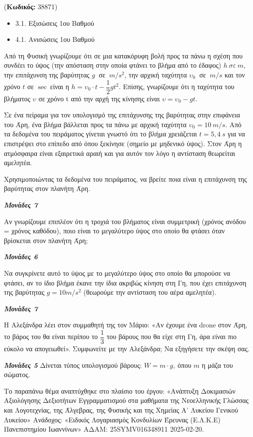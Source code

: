\documentclass[11pt,a4paper,twoside]{book}
\newcounter{askhsh}[chapter]
\renewcommand{\theaskhsh}{
	\bf{\titlefont{\Large{\thechapter}}.\arabic{askhsh}}
}
\newcommand{\Askhsh}[2]{\refstepcounter{askhsh}{\titlefont{Άσκηση\theaskhsh} - \textcolor{maincolor}{ΘΕΜΑ #2}} ({\small{\textbf{Κωδικός:} #1}})\\}{}
\newenvironment{ylh}{
\begin{tcolorbox}[
breakable,
enhanced standard,
titlerule=0pt,
toprule=0pt, 
rightrule=0pt, 
bottomrule=0pt,
title={\titlefont Ύλη άσκησης},
colback=white,
opacityback=0,
left=2mm,
top=1mm,
bottom=0mm,
boxrule=0pt,
colframe=white,
borderline west={1.5mm}{0pt}{secondarycolor},
leftrule=2mm,
sharp corners,
coltitle=black
]
\begin{itemize}[leftmargin=3mm, itemsep=0mm, label=\textcolor{secondarycolor}{{\small\faBook}}]
}{
\end{itemize}
\end{tcolorbox}
}
\newcommand{\monades}[1]{
\hspace*{\fill}
\textbf{\textit{\textcolor{maincolor}{Μονάδες #1}}}}
\begin{document}
\vspace{4mm}
\Askhsh{38871}{4}
\begin{ylh}
    \item 3.1. Εξισώσεις 1ου Βαθμού
    \item 4.1. Ανισώσεις 1ου Βαθμού
\end{ylh}

Από τη Φυσική γνωρίζουμε ότι σε μια κατακόρυφη βολή προς τα πάνω η σχέση που συνδέει το ύψος (την απόσταση στην οποία φτάνει το βλήμα από το έδαφος) $h\ \sigma\varepsilon\ m$, την επιτάχυνση της βαρύτητας $g\ $ σε $\ m/s^{2}$, την αρχική ταχύτητα $\upsilon_{0}\ $ σε $\ m/s$ και τον χρόνο $t$ σε $\sec\ $είναι η $h = \upsilon_{0} \cdot t - \dfrac{1}{2}gt^{2}$. Επίσης, γνωρίζουμε ότι η ταχύτητα του βλήματος $\upsilon$ σε χρόνο t από την αρχή της κίνησης είναι ${\upsilon = \upsilon}_{0} - gt$.

Σε ένα πείραμα για τον υπολογισμό της επιτάχυνσης της βαρύτητας στην επιφάνεια του Άρη, ένα βλήμα βάλλεται προς τα πάνω με αρχική ταχύτητα $\upsilon_{0} = 10\ m/s$. Από τα δεδομένα του πειράματος γίνεται γνωστό ότι το βλήμα χρειάζεται $t = 5,4\ s$ για να επιστρέψει στο επίπεδο από όπου ξεκίνησε (σημείο με μηδενικό ύψος). Στον Άρη η ατμόσφαιρα είναι εξαιρετικά αραιή και για αυτόν τον λόγο η αντίσταση θεωρείται αμελητέα.

\begin{alist}
\item Χρησιμοποιώντας τα δεδομένα του πειράματος, να βρείτε ποια είναι η επιτάχυνση της βαρύτητας στον πλανήτη Άρη.
\monades{7}
\item \begin{alist}
\item Αν γνωρίζουμε επιπλέον ότι η τροχιά του βλήματος είναι συμμετρική (χρόνος ανόδου = χρόνος καθόδου), ποιο είναι το μεγαλύτερο ύψος στο οποίο θα φτάσει όταν βρίσκεται στον πλανήτη Άρη;
\monades{6}
\item
  Να συγκρίνετε αυτό το ύψος με το μεγαλύτερο ύψος στο οποίο θα μπορούσε να φτάσει, αν το ίδιο βλήμα έκανε την ίδια ακριβώς κίνηση στη Γη, που έχει επιτάχυνση της βαρύτητας $g = 10m/s^{2}$ (θεωρούμε την αντίσταση του αέρα αμελητέα). 
\monades{7}
\end{alist}
\item Η Αλεξάνδρα λέει στον συμμαθητή της τον Μάριο: «Αν έχουμε ένα drone στον Άρη, το βάρος του θα είναι περίπου το $\dfrac{1}{3}$ του βάρους που θα είχε στη Γη, άρα είναι πιο εύκολο να απογειωθεί». Συμφωνείτε με την Αλεξάνδρα; Να εξηγήσετε την σκέψη σας.
\monades{5}
Δίνεται τύπος υπολογισμού βάρους: $W = m \cdot g,\ $όπου $m$ η μάζα του σώματος.

{\footnotesize Το παραπάνω θέμα αναπτύχθηκε στο πλαίσιο του έργου: «Ανάπτυξη Δοκιμασιών Αξιολόγησης Δεξιοτήτων Εγγραμματισμού στα μαθήματα της Νεοελληνικής Γλώσσας και Λογοτεχνίας, της Άλγεβρας, της Φυσικής και της Χημείας Α' Λυκείου Γενικού Λυκείου» Ανάδοχος: «Ειδικός Λογαριασμός Κονδυλίων Έρευνας (Ε.Λ.Κ.Ε) Πανεπιστημίου Ιωαννίνων» ΑΔΑΜ: 25SYMV016348911 2025-02-20.}
\end{alist}
\end{document}
